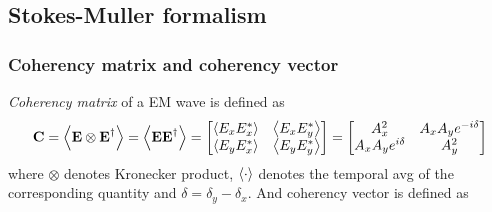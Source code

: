 \documentclass[11pt,a4paper]{article}
\numberwithin{equation}{section}
\begin{document}
\subsection{Stokes-Muller formalism}
\subsubsection{Coherency matrix and coherency vector}
\textit{Coherency matrix} of a EM wave is defined as \cite{WO} 
\begin{align}
	\textbf{C}=\expval{\textbf{E}\otimes\textbf{E}^\dagger}= \expval{\textbf{E}\textbf{E}^\dagger}=
	\begin{bmatrix}
		\expval{E_xE_x^\ast} & \expval{E_xE_y^\ast}\\
		\expval{E_yE_x^\ast} & \expval{E_yE_y^\ast}
	\end{bmatrix}=
\begin{bmatrix}
	{A_x^2} & {A_xA_ye^{-i\delta}}\\
	{A_xA_ye^{i\delta}} & {A_y^2}
\end{bmatrix}
\end{align}
where $\otimes$ denotes Kronecker product, $\expval{\cdot}$ denotes the temporal avg of the corresponding quantity and $\delta= \delta_y-\delta_x$.
And coherency vector is defined as 
\end{document}
